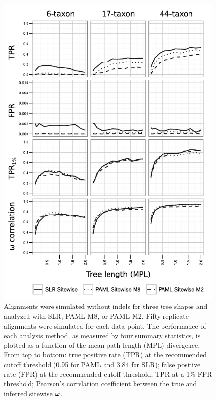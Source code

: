 \documentclass{mbe}
\begin{document}
\begin{figure}[t]
\begin{center}
\includegraphics[scale=0.75]{fig2.pdf}
\end{center}
\caption{Alignments were simulated without indels for three tree
  shapes and analyzed with SLR, PAML M8, or PAML M2. Fifty replicate
  alignments were simulated for each data point. The performance of
  each analysis method, as measured by four summary statistics, is
  plotted as a function of the mean path length (MPL) divergence. From
  top to bottom: true positive rate (TPR) at the recommended cutoff
  threshold (0.95 for PAML and 3.84 for SLR); false positive rate
  (FPR) at the recommended cutoff threshold; TPR at a 1\% FPR
  threshold; Pearson's correlation coefficient between the true and
  inferred sitewise $\bm{\omega}$.}
\label{fig_2}
\end{figure}
\end{document}
